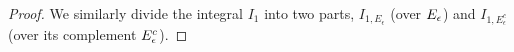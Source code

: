 \begin{proof}
We similarly divide the integral $I_1$ into two parts, $I_{1,E_\epsilon}$ 
(over $E_\epsilon$) and $I_{1,E_\epsilon^c}$ (over its complement 
$E^c_\epsilon$).

\end{proof}
